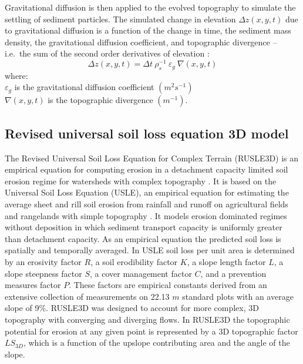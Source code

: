 \documentclass[esurf, manuscript]{copernicus}
\begin{document}
\noindent
Gravitational diffusion is then applied to the evolved topography
to simulate the settling of sediment particles. 
The simulated change in elevation $\Delta z(x,y,t) $ due to gravitational diffusion 
is a function of the change in time, the sediment mass density, 
the gravitational diffusion coefficient, and topographic divergence 
-- i.e.~the sum of the second order derivatives of elevation
\citep{thaxton2004}:
\begin{equation}
\label{eq:grav_diffusion} 
{\Delta z(x,y,t) = \Delta t ~ \rho_s^{-1} ~ \varepsilon_g ~ \nabla(x,y,t)}
\end{equation}
{\small
\noindent
where: \\
\noindent
\hspace*{0.5em} $\varepsilon_g$ is the gravitational diffusion coefficient $(m^{2} s^{-1})$\\ %
\hspace*{0.5em} $\nabla(x,y,t)$ is the topographic divergence $(m^{-1})$.\\
}

\subsection{Revised universal soil loss equation 3D model}
\label{rusle_model}
The Revised Universal Soil Loss Equation for Complex Terrain (RUSLE3D) 
is an empirical equation for computing erosion 
in a detachment capacity limited soil erosion regime
for watersheds with complex topography \citep{Mitasova1996}. 
It is based on 
the Universal Soil Loss Equation (USLE),
an empirical equation for estimating the average
sheet and rill soil erosion from rainfall and runoff
on agricultural fields and rangelands with simple topography 
\citep{Wischmeier1978}. 
It models erosion dominated regimes without deposition
in which sediment transport capacity is uniformly greater than detachment capacity.
As an empirical equation the predicted soil loss 
is spatially and temporally averaged. 
In USLE soil loss per unit area is determined by 
an erosivity factor $R$,
a soil erodibility factor $K$, 
a slope length factor $L$,
a slope steepness factor $S$,
a cover management factor $C$,
and a prevention measures factor $P$.
These factors are empirical constants derived 
from an extensive collection of measurements 
on 22.13 $m$ standard plots with an average slope of 9$\%$.  
%
RUSLE3D was designed to account for more complex, 3D topography 
with converging and diverging flows. 
In RUSLE3D the topographic potential for erosion at any given point 
is represented by a 3D topographic factor $LS_{3D}$,
which is a function of the upslope contributing area 
and the angle of the slope. 
\end{document}
